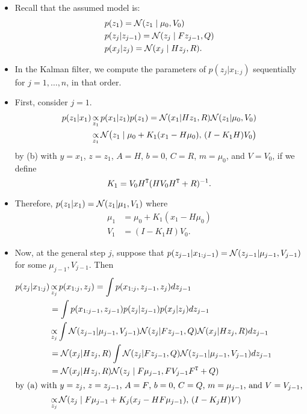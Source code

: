 \documentclass[12pt]{article}
\begin{document}
\begin{itemize}
\item Recall that the assumed model is:
\begin{align*}
& p(z_1) = \mathcal{N}(z_1 \mid \mu_0,V_0)\\
& p(z_j | z_{j-1}) = \mathcal{N}(z_j \mid F z_{j-1},Q)\\
& p(x_j | z_j) = \mathcal{N}(x_j \mid H z_j,R).
\end{align*}
\item In the Kalman filter, we compute the parameters of $p(z_j | x_{1:j})$ sequentially for $j = 1,\ldots,n$, in that order.
\item First, consider $j = 1$.
\begin{align*}
p(z_1 | x_1) &\mathop{\propto}_{z_1} p(x_1 | z_1) p(z_1)
= \mathcal{N}(x_1 | H z_1,R) \mathcal{N}(z_1 | \mu_0,V_0)\\
& \mathop{\propto}_{z_1} \mathcal{N}\big(z_1 \mid \mu_0+ K_1(x_1 - H \mu_0),\,(I - K_1 H) V_0 \big)
\end{align*}
by (b) with $y = x_1$, $z = z_1$, $A = H$, $b = 0$, $C = R$, $m = \mu_0$, and $V = V_0$, if we define
$$K_1 = V_0 H^{\mathtt{T}}(H V_0 H^{\mathtt{T}} + R)^{-1}. $$
\item Therefore, $p(z_1 | x_1) = \mathcal{N}(z_1 | \mu_1,V_1)$ where
\begin{align*}
\mu_1 & = \mu_0+ K_1(x_1 - H \mu_0)\\
V_1 & = (I - K_1 H) V_0.
\end{align*}
\item Now, at the general step $j$, suppose that $p(z_{j-1} | x_{1:j-1}) = \mathcal{N}(z_{j-1} | \mu_{j-1},V_{j-1})$ for some $\mu_{j-1},V_{j-1}$. Then
\begin{align*}
p(z_j | x_{1:j}) &\mathop{\propto}_{z_j} p(x_{1:j},z_j) = \int p(x_{1:j},z_{j-1},z_j) d z_{j-1}\\
& = \int p(x_{1:j-1},z_{j-1}) p(z_j | z_{j-1}) p(x_j | z_j) d z_{j-1}\\
&\mathop{\propto}_{z_j} \int \mathcal{N}(z_{j-1} | \mu_{j-1},V_{j-1})
\mathcal{N}(z_j | F z_{j-1},Q) \mathcal{N}(x_j | H z_j,R) d z_{j-1}\\
& = \mathcal{N}(x_j | H z_j,R) \int \mathcal{N}(z_j | F z_{j-1},Q) \mathcal{N}(z_{j-1} | \mu_{j-1},V_{j-1}) d z_{j-1}\\
& = \mathcal{N}(x_j | H z_j,R) \mathcal{N}(z_j \mid F \mu_{j-1},F V_{j-1} F^{\mathtt{T}} + Q)\\
\intertext{by (a) with $y = z_j$, $z = z_{j-1}$, $A = F$, $b = 0$, $C = Q$, $m = \mu_{j-1}$, and $V = V_{j-1}$,}
& \mathop{\propto}_{z_j} \mathcal{N}(z_j \mid F \mu_{j-1} + K_j(x_j - H F \mu_{j-1}),\,(I - K_j H) V)
\end{align*}

\end{itemize}
\end{document}
